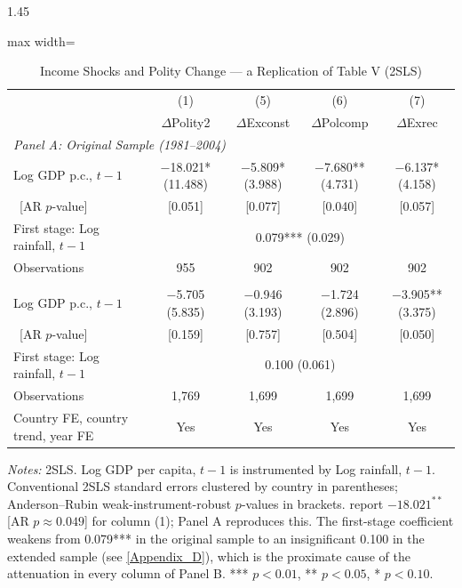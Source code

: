 \documentclass[12pt]{article}
\begin{document}
\begin{bibunit}[jpe]
\begin{spacing}{1.45}
\begin{table}[H]
\centering
\begin{adjustbox}{max width=\textwidth}
\begin{threeparttable}
\caption{Income Shocks and Polity Change --- a Replication of Table V (2SLS)}
\label{tab:A3}
\begin{tabular}{lcccc}
\toprule
 & (1) & (5) & (6) & (7) \\
 & $\Delta$Polity2 & $\Delta$Exconst & $\Delta$Polcomp & $\Delta$Exrec \\
\midrule
\multicolumn{5}{l}{\textit{Panel A: Original Sample (1981--2004)}} \\
Log GDP p.c., $t-1$ & $-$18.021* (11.488) & $-$5.809* (3.988) & $-$7.680** (4.731) & $-$6.137* (4.158) \\
\ [AR $p$-value]     & [0.051]             & [0.077]           & [0.040]            & [0.057] \\
First stage: Log rainfall, $t-1$ & \multicolumn{4}{c}{0.079*** (0.029)} \\
Observations         & 955                 & 902               & 902                & 902 \\
\addlinespace
\multicolumn{5}{l}{\textit{Panel B: Extended Sample (1981--2024)}} \\
Log GDP p.c., $t-1$ & $-$5.705 (5.835)    & $-$0.946 (3.193)  & $-$1.724 (2.896)   & $-$3.905** (3.375) \\
\ [AR $p$-value]     & [0.159]             & [0.757]           & [0.504]            & [0.050] \\
First stage: Log rainfall, $t-1$ & \multicolumn{4}{c}{0.100 (0.061)} \\
Observations         & 1{,}769             & 1{,}699           & 1{,}699            & 1{,}699 \\
\midrule
Country FE, country trend, year FE & Yes & Yes & Yes & Yes \\
\bottomrule
\end{tabular}
\begin{tablenotes}[flushleft]
\footnotesize
\item \textit{Notes:} 2SLS. Log GDP per capita, $t-1$ is instrumented by Log rainfall, $t-1$. Conventional 2SLS standard errors clustered by country in parentheses; Anderson--Rubin \citep{andersonrubin1949} weak-instrument-robust $p$-values in brackets. \citet{bruckner2011rain} report $-18.021^{**}$ [AR $p\approx0.049$] for column (1); Panel A reproduces this. The first-stage coefficient weakens from 0.079*** in the original sample to an insignificant 0.100 in the extended sample (see \ref{Appendix_D}), which is the proximate cause of the attenuation in every column of Panel B. *** $p<0.01$, ** $p<0.05$, * $p<0.10$.
\end{tablenotes}
\end{threeparttable}
\end{adjustbox}
\end{table}


\end{spacing}
\end{bibunit}
\end{document}
